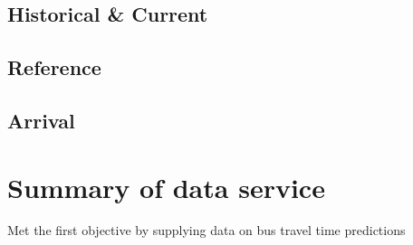 \subsection{Historical \& Current}
\subsection{Reference}
\subsection{Arrival}



\section{Summary of data service}
Met the first objective by supplying data on bus travel time predictions
